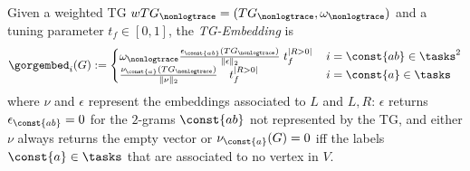 \begin{definition}[TG-Embedding]\label{def:ppne}
	Given a weighted TG $wTG_\nonlogtrace=(TG_{\nonlogtrace},\omega_\nonlogtrace)$ and a tuning parameter $t_f\in[0,1]$, the \emph{TG-Embedding} is 
	$$\gorgembed_{i}(G):=\begin{cases}
	\omega_\nonlogtrace \frac{\epsilon_\const{ab}(TG_{\nonlogtrace})}{\|\epsilon\|_2}\;t_f^{|R>0|}\, & {i}=\const{ab}\in\tasks^2\\
	\frac{\nu_\const{a}(TG_{\nonlogtrace})}{\|\nu\|_2}\;\;\;\,t_f^{|R>0|}\, & {i}=\const{a}\in\tasks\\
	\end{cases}$$
	where $\nu$ and $\epsilon$ represent the embeddings associated to $L$ and $L,R$: $\epsilon$  returns 
	$\epsilon_\const{ab}=0$ for the $2$-grams $\const{ab}$ not represented by the TG, and either $\nu$ always returns the empty 
	vector or $\nu_\const{a}(G)=0$ iff the labels $\const{a}\in\tasks$ that are associated to no vertex in $V$.
\end{definition}
